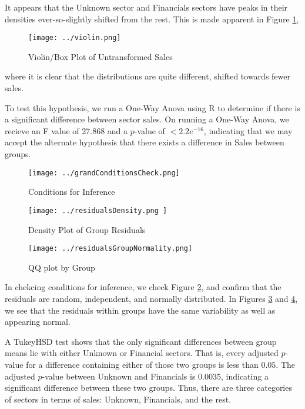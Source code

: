 \documentclass[a4paper]{article}
\begin{document}
It appears that the Unknown sector and Financials sectors have peaks in their densities ever-so-slightly shifted from the rest. This is made apparent in Figure \ref{fig:violin},

\begin{figure}[H]
	\centering
	\texttt{[image: ../violin.png]}
	\caption{Violin/Box Plot of Untransformed Sales}
	\label{fig:violin}
\end{figure}

where it is clear that the distributions are quite different, shifted towards fewer sales. 

To test this hypothesis, we run a One-Way Anova using R to determine if there is a significant difference between sector sales. On running a One-Way Anova, we recieve an F value of 27.868 and a \(p\)-value of \(<2.2e^{-16}\), indicating that we may accept the alternate hypothesis that there exists a difference in Sales between groups. 

\begin{figure}[H]
	\centering
	\texttt{[image: ../grandConditionsCheck.png]}
	\caption{Conditions for Inference}
	\label{fig:grandCondies}
\end{figure} 

\begin{figure}[H]
	\centering
	\texttt{[image: ../residualsDensity.png
	]}
	\caption{Density Plot of Group Residuals}
	\label{fig:groupRes}
\end{figure}

\begin{figure}[H]
	\centering
	\texttt{[image: ../residualsGroupNormality.png]}
	\caption{QQ plot by Group}
	\label{fig:QQ-plot-by-Group}
\end{figure}
In chekcing conditions for inference, we check Figure \ref{fig:grandCondies},
and confirm that the residuals are random, independent, and normally distributed. 
In Figures \ref{fig:groupRes} and \ref{fig:QQ-plot-by-Group}, we see that the residuals within groups have the same variability as well as appearing normal. 

A TukeyHSD test shows that the only significant differences between group means lie with either Unknown or Financial sectors. That is, every adjusted \(p \)-value for a difference containing either of those two groups is less than \(0.05\). The adjusted \(p\)-value between Unknown and Financials is 0.0035, indicating a significant difference between these two groups. Thus, there are three categories of sectors in terms of sales: Unknown, Financials, and the rest.
\end{document}
